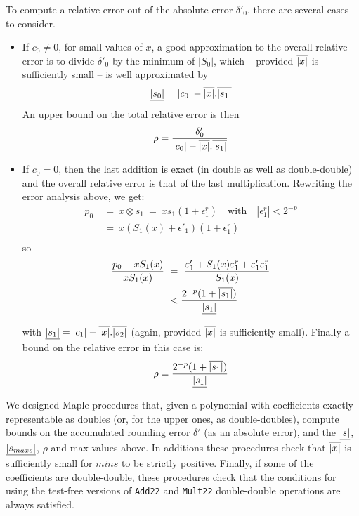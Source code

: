 To compute a  relative error out of the absolute error
$\delta'_0$, there are several cases to consider.
\begin{itemize}
\item If $c_0\ne 0$, for small values of $x$, a good approximation to
  the overall relative error is to divide $\delta'_0$ by the minimum
  of $|S_0|$, which -- provided ${\overline{|x|}}$ is sufficiently small --  is well approximated by 
$$\underline{|s_{0}|}=|c_0| - {\overline{|x|}} . \overline{|s_{1}|}$$
  An upper bound on the total
  relative error is then
$$\rho = \frac{\delta'_0}{|c_0| - {\overline{|x|}} . \overline{|s_{1}|}}$$

\item If $c_0=0$, then the last addition is exact (in double as well
  as double-double) and the overall relative error is that of the last
  multiplication. Rewriting the error analysis above, we get:
\begin{align*}
p_{0}  & \ = \  x \otimes s_{1} \ = \ xs_1(1 + \epsilon^r_{1})         \quad \mathrm{with} \quad  |\epsilon^r_{1}| < 2^{-p}\\
       & \ = \  x (S_1(x) + \epsilon'_1)(1 + \epsilon^r_{1}) \\
\end{align*}
so 
\begin{align*}
\frac{p_{0} - xS_1(x)}{xS_1(x)}  & \ = \ \frac{ \varepsilon'_1 + S_1(x)\varepsilon^r_{1} + \varepsilon'_1\varepsilon^r_{1}}{S_1(x)}\\
     & \ < \frac{2^{-p}(1+\overline{|s_{1}|})}{\underline{|s_{1}|}}  
\end{align*}

with $\underline{|s_{1}|}  =|c_1| - {\overline{|x|}} . \overline{|s_{2}|}$
(again, provided ${\overline{|x|}}$ is sufficiently small). Finally a bound on the relative error in this case is:
$$\rho = \frac{2^{-p}(1+\overline{|s_{1}|})}{\underline{|s_{1}|}} $$


 
\end{itemize}


We designed Maple procedures that, given a polynomial with
coefficients exactly representable as doubles (or, for the upper ones,
as double-doubles), compute bounds on the accumulated rounding error
$\delta'$ (as an absolute error), and the $\underline{|s_{}|}$, $\underline{|s_{maxs}|}$,
$\rho$ and max values above. In additions these procedures check that
${\overline{|x|}}$ is sufficiently small for $mins$ to be strictly positive.
Finally, if some of the coefficients are double-double, these
procedures check that the conditions for using the test-free versions
of \texttt{Add22} and \texttt{Mult22} double-double operations are
always satisfied.
